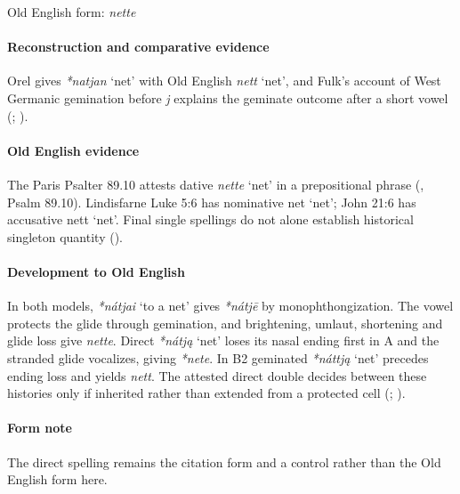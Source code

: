 \documentclass[
  british,
  a4paper,
]{article}
\providecommand{\Recon}[1]{\emph{*#1}}
\begin{document}
Old English form: \emph{nette}

\paragraph{Reconstruction and comparative
evidence}\label{reconstruction-and-comparative-evidence-49}

Orel gives \Recon{natjan} `net' with Old English {\emph{nett}} `net',
and Fulk's account of West Germanic gemination before \emph{j} explains
the geminate outcome after a short vowel (; ).

\paragraph{Old English evidence}\label{old-english-evidence-51}

The Paris Psalter 89.10 attests dative \emph{nette} `net' in a
prepositional phrase (, Psalm
89.10). Lindisfarne Luke 5:6 has nominative {net} `net'; John 21:6 has
accusative {nett} `net'. Final single spellings do not alone establish
historical singleton quantity ().

\paragraph{Development to Old
English}\label{development-to-old-english-50}

In both models, \Recon{nátjai} `to a net' gives \emph{*nátjē} by
monophthongization. The vowel protects the glide through gemination, and
brightening, umlaut, shortening and glide loss give \emph{nette}. Direct
\Recon{nátją} `net' loses its nasal ending first in A and the stranded
glide vocalizes, giving \emph{*nete}. In B2 geminated \Recon{náttją}
`net' precedes ending loss and yields \emph{nett}. The attested direct
double decides between these histories only if inherited rather than
extended from a protected cell (; ).

\paragraph{Form note}\label{form-note-13}

The direct spelling remains the citation form and a control rather than
the Old English form here.
\end{document}

